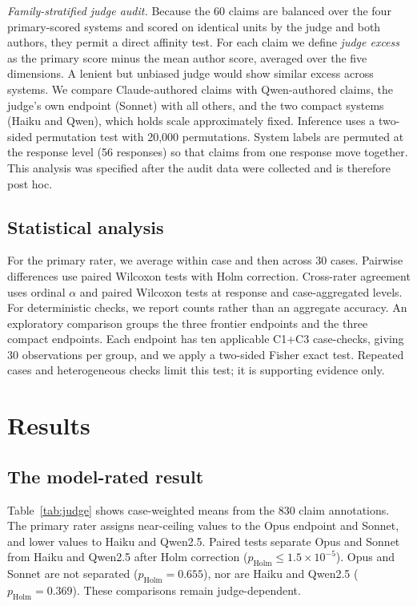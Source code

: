 \documentclass[conference]{IEEEtran}
\newcommand{\checkc}[1]{\textsc{#1}}
\begin{document}
\emph{Family-stratified judge audit.} Because the 60 claims are balanced over
the four primary-scored systems and scored on identical units by the judge and
both authors, they permit a direct affinity test. For each claim we define
\emph{judge excess} as the primary score minus the mean author score, averaged
over the five dimensions. A lenient but unbiased judge would show similar
excess across systems. We compare Claude-authored claims with Qwen-authored
claims, the judge's own endpoint (Sonnet) with all others, and the two compact
systems (Haiku and Qwen), which holds scale approximately fixed. Inference uses
a two-sided permutation test with 20{,}000 permutations. System labels are
permuted at the response level (56 responses) so that claims from one response
move together. This analysis was specified after the audit data were collected
and is therefore post hoc.

\subsection{Statistical analysis}
For the primary rater, we average within case and then across 30 cases. Pairwise
differences use paired Wilcoxon tests with Holm correction. Cross-rater
agreement uses ordinal $\alpha$ and paired Wilcoxon tests at response and
case-aggregated levels. For deterministic checks, we report counts rather than
an aggregate accuracy. An exploratory comparison groups the three frontier
endpoints and the three compact endpoints. Each endpoint has ten applicable
\checkc{C1}+\checkc{C3} case-checks, giving 30 observations per group, and we
apply a two-sided Fisher exact test. Repeated cases and heterogeneous checks
limit this test; it is supporting evidence only.

\section{Results}
\subsection{The model-rated result}
Table~\ref{tab:judge} shows case-weighted means from the 830 claim annotations.
The primary rater assigns near-ceiling values to the Opus endpoint and Sonnet,
and lower values to Haiku and Qwen2.5. Paired tests separate Opus and Sonnet
from Haiku and Qwen2.5 after Holm correction
($p_{\mathrm{Holm}}\leq1.5\times10^{-5}$). Opus and Sonnet are not separated
($p_{\mathrm{Holm}}=0.655$), nor are Haiku and Qwen2.5
($p_{\mathrm{Holm}}=0.369$). These comparisons remain judge-dependent.
\end{document}
